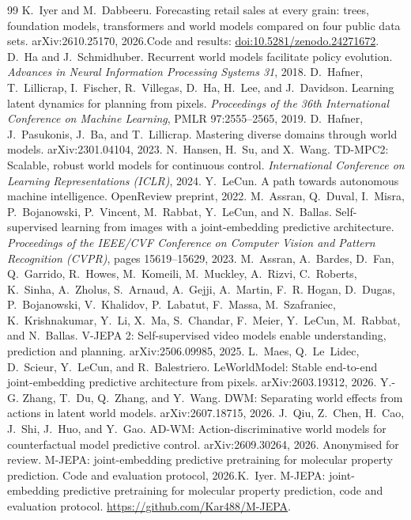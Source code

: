 \begin{thebibliography}{99}
\footnotesize
\setlength{\itemsep}{1.5pt}\setlength{\parskip}{0pt}
 K.~Iyer and M.~Dabbeeru. Forecasting retail sales at every grain: trees, foundation models, transformers and world models compared on four public data sets. arXiv:2610.25170, 2026.\iftmlr\else Code and results: \href{https://doi.org/10.5281/zenodo.24271672}{doi:10.5281/zenodo.24271672}.\fi
{} D.~Ha and J.~Schmidhuber. Recurrent world models facilitate policy evolution. \emph{Advances in Neural Information Processing Systems 31}, 2018.
 D.~Hafner, T.~Lillicrap, I.~Fischer, R.~Villegas, D.~Ha, H.~Lee, and J.~Davidson. Learning latent dynamics for planning from pixels. \emph{Proceedings of the 36th International Conference on Machine Learning}, PMLR 97:2555--2565, 2019.
 D.~Hafner, J.~Pasukonis, J.~Ba, and T.~Lillicrap. Mastering diverse domains through world models. arXiv:2301.04104, 2023.
 N.~Hansen, H.~Su, and X.~Wang. TD-MPC2: Scalable, robust world models for continuous control. \emph{International Conference on Learning Representations (ICLR)}, 2024.
 Y.~LeCun. A path towards autonomous machine intelligence. OpenReview preprint, 2022.
 M.~Assran, Q.~Duval, I.~Misra, P.~Bojanowski, P.~Vincent, M.~Rabbat, Y.~LeCun, and N.~Ballas. Self-supervised learning from images with a joint-embedding predictive architecture. \emph{Proceedings of the IEEE/CVF Conference on Computer Vision and Pattern Recognition (CVPR)}, pages 15619--15629, 2023.
 M.~Assran, A.~Bardes, D.~Fan, Q.~Garrido, R.~Howes, M.~Komeili, M.~Muckley, A.~Rizvi, C.~Roberts, K.~Sinha, A.~Zholus, S.~Arnaud, A.~Gejji, A.~Martin, F.~R. Hogan, D.~Dugas, P.~Bojanowski, V.~Khalidov, P.~Labatut, F.~Massa, M.~Szafraniec, K.~Krishnakumar, Y.~Li, X.~Ma, S.~Chandar, F.~Meier, Y.~LeCun, M.~Rabbat, and N.~Ballas. V-JEPA 2: Self-supervised video models enable understanding, prediction and planning. arXiv:2506.09985, 2025.
 L.~Maes, Q.~Le~Lidec, D.~Scieur, Y.~LeCun, and R.~Balestriero. LeWorldModel: Stable end-to-end joint-embedding predictive architecture from pixels. arXiv:2603.19312, 2026.
 Y.-G. Zhang, T.~Du, Q.~Zhang, and Y.~Wang. DWM: Separating world effects from actions in latent world models. arXiv:2607.18715, 2026.
 J.~Qiu, Z.~Chen, H.~Cao, J.~Shi, J.~Huo, and Y.~Gao. AD-WM: Action-discriminative world models for counterfactual model predictive control. arXiv:2609.30264, 2026.
 \ifjournal Anonymised for review. M-JEPA: joint-embedding predictive pretraining for molecular property prediction. Code and evaluation protocol, 2026.\else K.~Iyer. M-JEPA: joint-embedding predictive pretraining for molecular property prediction, code and evaluation protocol. \url{https://github.com/Kar488/M-JEPA}.\fi

\end{thebibliography}
